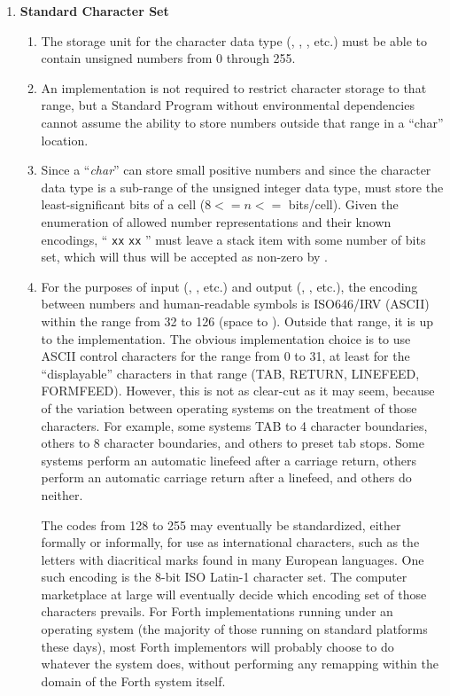 \begin{enumerate}
\item \textbf{Standard Character Set}

	\begin{enumerate}
	\item The storage unit for the character data type
		(, , , etc.)
		must be able to contain unsigned numbers from 0 through 255.

	\item An implementation is not required to restrict character
		storage to that range, but a Standard Program without
		environmental dependencies cannot assume the ability to
		store numbers outside that range in a ``char'' location.

	\item Since a ``\emph{char}'' can store small positive numbers
		and since the character data type is a sub-range of the
		unsigned integer data type,  must store the 
		least-significant bits of a cell ($8 <= n <=$ bits/cell).
		Given the enumeration of allowed number representations and
		their known encodings, `` \texttt{xx} 
		\texttt{xx} '' must leave a stack item with some
		number of bits set, which will thus will be accepted as
		non-zero by .

	\item For the purposes of input (, , etc.)
		and output (, , etc.), the encoding
		between numbers and human-readable symbols is ISO646/IRV
		(ASCII) within the range from 32 to 126 (space to \tilde).
		Outside that range, it is up to the implementation. The
		obvious implementation choice is to use ASCII control
		characters for the range from 0 to 31, at least for the
		``displayable'' characters in that range (TAB, RETURN, LINEFEED,
		FORMFEED). However, this is not as clear-cut as it may seem,
		because of the variation between operating systems on the
		treatment of those characters. For example, some systems TAB
		to 4 character boundaries, others to 8 character boundaries,
		and others to preset tab stops. Some systems perform an automatic
		linefeed after a carriage return, others perform an automatic
		carriage return after a linefeed, and others do neither.

		The codes from 128 to 255 may eventually be standardized,
		either formally or informally, for use as international
		characters, such as the letters with diacritical marks found
		in many European languages. One such encoding is the 8-bit
		ISO Latin-1 character set. The computer marketplace at large
		will eventually decide which encoding set of those characters
		prevails. For Forth implementations running under an
		operating system (the majority of those running on standard
		platforms these days), most Forth implementors will probably
		choose to do whatever the system does, without performing any
		remapping within the domain of the Forth system itself.


\end{enumerate}
\end{enumerate}
